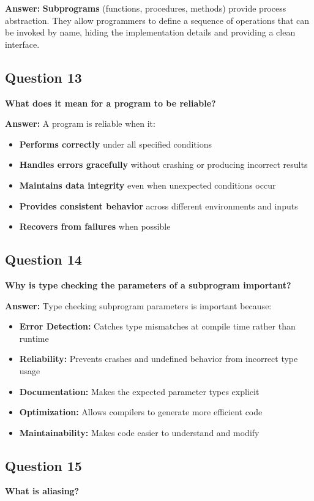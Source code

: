 \documentclass[11pt,a4paper]{article}
\begin{document}
\textbf{Answer:}
\textbf{Subprograms} (functions, procedures, methods) provide process abstraction. They allow programmers to define a sequence of operations that can be invoked by name, hiding the implementation details and providing a clean interface.

\subsection{Question 13}
\textbf{What does it mean for a program to be reliable?}

\textbf{Answer:}
A program is reliable when it:

\begin{itemize}
\item \textbf{Performs correctly} under all specified conditions
\item \textbf{Handles errors gracefully} without crashing or producing incorrect results
\item \textbf{Maintains data integrity} even when unexpected conditions occur
\item \textbf{Provides consistent behavior} across different environments and inputs
\item \textbf{Recovers from failures} when possible
\end{itemize}

\subsection{Question 14}
\textbf{Why is type checking the parameters of a subprogram important?}

\textbf{Answer:}
Type checking subprogram parameters is important because:

\begin{itemize}
\item \textbf{Error Detection:} Catches type mismatches at compile time rather than runtime
\item \textbf{Reliability:} Prevents crashes and undefined behavior from incorrect type usage
\item \textbf{Documentation:} Makes the expected parameter types explicit
\item \textbf{Optimization:} Allows compilers to generate more efficient code
\item \textbf{Maintainability:} Makes code easier to understand and modify
\end{itemize}

\subsection{Question 15}
\textbf{What is aliasing?}
\end{document}
